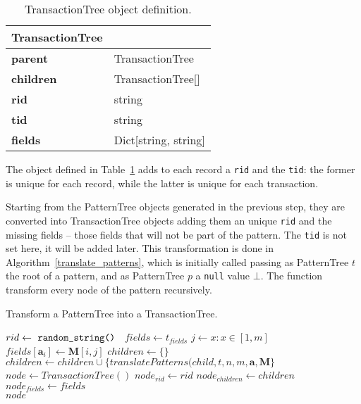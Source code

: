 \documentclass{acm_proc_article-sp-sigmod09}
\begin{document}
\begin{table}[H]
\centering
\begin{tabular}{|ll|} \hline
\textbf{TransactionTree} & \\ \hline
\textbf{parent} & TransactionTree \\ \hline
\textbf{children} & TransactionTree[] \\ \hline
\textbf{rid} & string \\ \hline
\textbf{tid} & string \\ \hline
\textbf{fields} & Dict[string, string] \\
\hline\end{tabular}
\caption{TransactionTree object definition.}
\label{tab:transactiontree}
\end{table}

The object defined in Table~\ref{tab:transactiontree} adds to each record a \texttt{rid} and the \texttt{tid}: the former is unique for each record, while the latter is unique for each transaction.

Starting from the PatternTree objects generated in the previous step, they are converted into TransactionTree objects adding them an unique \texttt{rid} and the missing fields -- those fields that will not be part of the pattern. The \texttt{tid} is not set here, it will be added later. This transformation is done in Algorithm~\ref{translate_patterns}, which is initially called passing as PatternTree $t$ the root of a pattern, and as PatternTree $p$ a \texttt{null} value $\bot$. The function transform every node of the pattern recursively.

\begin{algorithm}
\caption{Transform a PatternTree into a TransactionTree.}
\label{translate_patterns}
\begin{algorithmic}[1]
\State $rid \gets \text{ \texttt{random\_string() }}$
\State $fields \gets t_{fields}$
		\State $j \gets x : x \in [1, m]$
		\State $fields[\boldsymbol{a}_i] \gets \boldsymbol{M}[i,j]$
	\EndIf
\EndFor
\State $children \gets \{\}$
	\State $children \gets children \cup \{translatePatterns(child, t, n, m, \boldsymbol{a}, \boldsymbol{M}\}$
\EndFor
\State $node \gets TransactionTree()$
\State $node_{rid} \gets rid$
\State $node_{children} \gets children$
\State $node_{fields} \gets fields$ \\
\Return $node$
\EndFunction
\end{algorithmic}
\end{algorithm}
\end{document}
